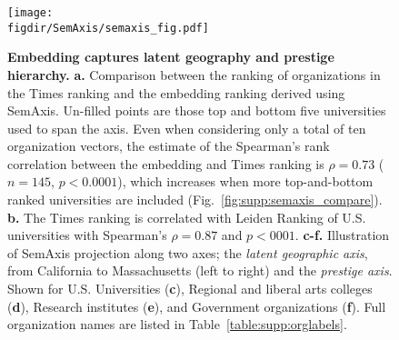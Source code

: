 \documentclass[12pt]{article} %
\def\figdir{../Figs}
\begin{document}
%
%
\begin{figure}[hp!]
	\centering
	\texttt{[image: \\figdir/SemAxis/semaxis\_fig.pdf]}
	\caption{
		\textbf{Embedding captures latent geography and prestige hierarchy.}
		\textbf{a.} Comparison between the ranking of organizations in the Times ranking and the embedding ranking derived using SemAxis.
		Un-filled points are those top and bottom five universities used to span the axis.
		Even when considering only a total of ten organization vectors, the estimate of the Spearman's rank correlation between the embedding and Times ranking is $\rho = 0.73$ ($n = 145$, $p < 0.0001$), which increases when more top-and-bottom ranked universities are included (Fig.~\ref{fig:supp:semaxis_compare}).
		\textbf{b.} The Times ranking is correlated with Leiden Ranking of U.S. universities with Spearman's $\rho = 0.87$ and $p < 0001$.
		\textbf{c-f.} Illustration of SemAxis projection along two axes;  the \textit{latent geographic axis}, from California to Massachusetts (left to right) and the \textit{prestige axis}.
		Shown for U.S. Universities (\textbf{c}), Regional and liberal arts colleges (\textbf{d}), Research institutes (\textbf{e}), and Government organizations (\textbf{f}).
		Full organization names are listed in Table~\ref{table:supp:orglabels}.
	}
	\label{fig:semaxis}
\end{figure}
\end{document}
